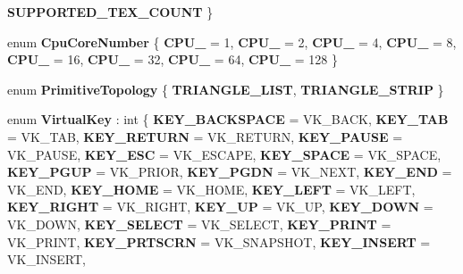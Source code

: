 \begin{DoxyCompactItemize}
{\bfseries S\+U\+P\+P\+O\+R\+T\+E\+D\+\_\+\+T\+E\+X\+\_\+\+C\+O\+U\+NT}
 \}
\item 
\mbox{\label{namespace_blade_a5914a3cc4bab969db7ba1f424794d294}} 
enum {\bfseries Cpu\+Core\+Number} \{ \newline
{\bfseries C\+P\+U\+\_} = 1, 
{\bfseries C\+P\+U\+\_} = 2, 
{\bfseries C\+P\+U\+\_} = 4, 
{\bfseries C\+P\+U\+\_} = 8, 
\newline
{\bfseries C\+P\+U\+\_} = 16, 
{\bfseries C\+P\+U\+\_} = 32, 
{\bfseries C\+P\+U\+\_} = 64, 
{\bfseries C\+P\+U\+\_} = 128
 \}
\item 
\mbox{\label{namespace_blade_ad4fbecde6f3e533ead21764c5c709985}} 
enum {\bfseries Primitive\+Topology} \{ {\bfseries T\+R\+I\+A\+N\+G\+L\+E\+\_\+\+L\+I\+ST}, 
{\bfseries T\+R\+I\+A\+N\+G\+L\+E\+\_\+\+S\+T\+R\+IP}
 \}
\item 
\mbox{\label{namespace_blade_a15d9bde4921fb2a9a953f8d97ea49d1c}} 
enum {\bfseries Virtual\+Key} \+: int \{ \newline
{\bfseries K\+E\+Y\+\_\+\+B\+A\+C\+K\+S\+P\+A\+CE} = V\+K\+\_\+\+B\+A\+CK, 
{\bfseries K\+E\+Y\+\_\+\+T\+AB} = V\+K\+\_\+\+T\+AB, 
{\bfseries K\+E\+Y\+\_\+\+R\+E\+T\+U\+RN} = V\+K\+\_\+\+R\+E\+T\+U\+RN, 
{\bfseries K\+E\+Y\+\_\+\+P\+A\+U\+SE} = V\+K\+\_\+\+P\+A\+U\+SE, 
\newline
{\bfseries K\+E\+Y\+\_\+\+E\+SC} = V\+K\+\_\+\+E\+S\+C\+A\+PE, 
{\bfseries K\+E\+Y\+\_\+\+S\+P\+A\+CE} = V\+K\+\_\+\+S\+P\+A\+CE, 
{\bfseries K\+E\+Y\+\_\+\+P\+G\+UP} = V\+K\+\_\+\+P\+R\+I\+OR, 
{\bfseries K\+E\+Y\+\_\+\+P\+G\+DN} = V\+K\+\_\+\+N\+E\+XT, 
\newline
{\bfseries K\+E\+Y\+\_\+\+E\+ND} = V\+K\+\_\+\+E\+ND, 
{\bfseries K\+E\+Y\+\_\+\+H\+O\+ME} = V\+K\+\_\+\+H\+O\+ME, 
{\bfseries K\+E\+Y\+\_\+\+L\+E\+FT} = V\+K\+\_\+\+L\+E\+FT, 
{\bfseries K\+E\+Y\+\_\+\+R\+I\+G\+HT} = V\+K\+\_\+\+R\+I\+G\+HT, 
\newline
{\bfseries K\+E\+Y\+\_\+\+UP} = V\+K\+\_\+\+UP, 
{\bfseries K\+E\+Y\+\_\+\+D\+O\+WN} = V\+K\+\_\+\+D\+O\+WN, 
{\bfseries K\+E\+Y\+\_\+\+S\+E\+L\+E\+CT} = V\+K\+\_\+\+S\+E\+L\+E\+CT, 
{\bfseries K\+E\+Y\+\_\+\+P\+R\+I\+NT} = V\+K\+\_\+\+P\+R\+I\+NT, 
\newline
{\bfseries K\+E\+Y\+\_\+\+P\+R\+T\+S\+C\+RN} = V\+K\+\_\+\+S\+N\+A\+P\+S\+H\+OT, 
{\bfseries K\+E\+Y\+\_\+\+I\+N\+S\+E\+RT} = V\+K\+\_\+\+I\+N\+S\+E\+RT, 

\end{DoxyCompactItemize}

